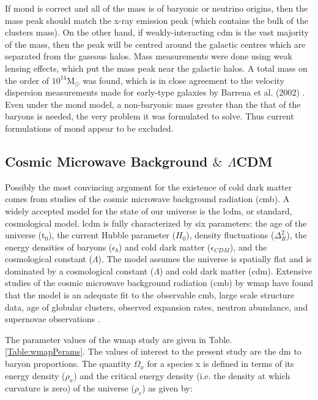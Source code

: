 If \gls{mond} is correct and all of the mass is of baryonic or neutrino origins, then the mass peak should match the x-ray emission peak (which contains the bulk of the clusters mass). On the other hand, if weakly-interacting \gls{cdm} is the vast majority of the mass, then the peak will be centred around the galactic centres which are separated from the gaseous halos. Mass measurements were done using weak lensing effects, which put the mass peak near the galactic halos. A total mass on the order of $10^{14}$M$_{\odot}$ was found, which is in close agreement to the velocity dispersion measurements made for early-type galaxies by Barrena et al. (2002) \cite{Barrena2002ClusterStudy}. Even under the \gls{mond} model, a non-baryonic mass greater than the that of the baryons is needed, the very problem it was formulated to solve. Thus current formulations of \gls{mond} appear to be excluded.
 

\subsection{Cosmic Microwave Background $\&$ $\Lambda$CDM}

Possibly the most convincing argument for the existence of cold dark matter comes from studies of the cosmic microwave background radiation (\gls{cmb}). A widely accepted model for the state of our universe is the \gls{lcdm}, or standard, cosmological model. \gls{lcdm} is fully characterized by six parameters: the age of the universe (t$_0$), the current Hubble parameter ($H_0$), density fluctuations ($\Delta_{R}^2$), the energy densities of baryons ($\epsilon_b$) and cold dark matter ($\epsilon_{CDM}$), and the cosmological constant ($\Lambda$). The model assumes the universe is spatially flat and is dominated by a cosmological constant ($\Lambda$) and cold dark matter (\gls{cdm}). Extensive studies of the cosmic microwave background radiation (\gls{cmb}) by \gls{wmap} \cite{wmap9Year} have found that the model is an adequate fit to the observable \gls{cmb}, large scale structure data, age of globular clusters, observed expansion rates, neutron abundance, and supernovae observations \cite{wmap9Year}. 

The parameter values of the \gls{wmap} study are given in Table. \ref{Table:wmapPerams}. The values of interest to the present study are the \gls{dm} to baryon proportions. The quantity $\Omega_x$ for a species x is defined in terms of its energy density ($\rho_x$) and the critical energy density (i.e. the density at which curvature is zero) of the universe ($\rho_c$) as given by: 

